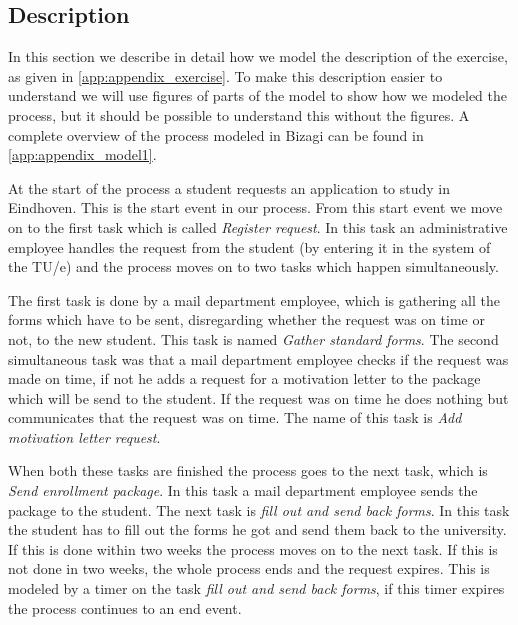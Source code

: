 
\subsection{Description}
In this section we describe in detail how we model the description of the exercise, as given in \autoref{app:appendix_exercise}.
To make this description easier to understand we will use figures of parts of the model to show how we modeled the process, but it should be possible to understand this without the figures.
A complete overview of the process modeled in Bizagi can be found in \autoref{app:appendix_model1}.

At the start of the process a student requests an application to study in Eindhoven.
This is the start event in our process.
From this start event we move on to the first task which is called \emph{Register request}.
In this task an administrative employee handles the request from the student (by entering it in the system of the TU/e) and the process moves on to two tasks which happen simultaneously.

The first task is done by a mail department employee, which is gathering all the forms which have to be sent, disregarding whether the request was on time or not, to the new student.
This task is named \emph{Gather standard forms}.
The second simultaneous task was that a mail department employee checks if the request was made on time, if not he adds a request for a motivation letter to the package which will be send to the student.
If the request was on time he does nothing but communicates that the request was on time.
The name of this task is \emph{Add motivation letter request}.

When both these tasks are finished the process goes to the next task, which is \emph{Send enrollment package}.
In this task a mail department employee sends the package to the student.
The next task is \emph{fill out and send back forms}.
In this task the student has to fill out the forms he got and send them back to the university.
If this is done within two weeks the process moves on to the next task.
If this is not done in two weeks, the whole process ends and the request expires.
This is modeled by a timer on the task \emph{fill out and send back forms}, if this timer expires the process continues to an end event.

